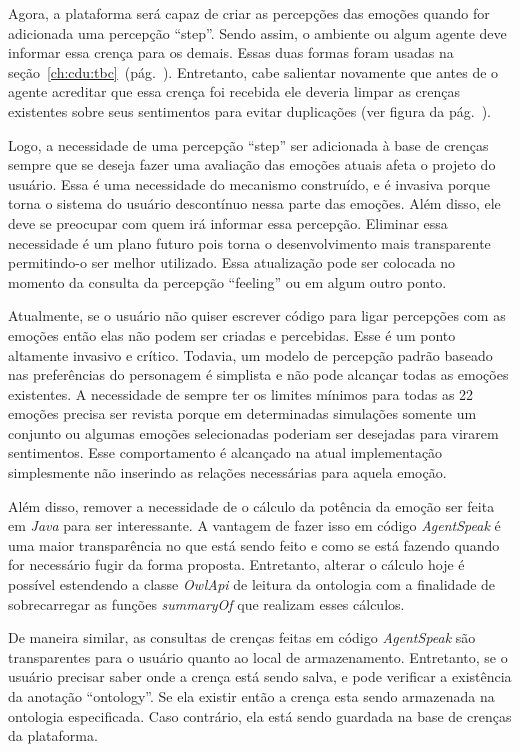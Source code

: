 Agora, a plataforma \jason será capaz de criar as percepções das emoções
quando for adicionada uma percepção ``step''. Sendo assim, o ambiente ou algum
agente deve informar essa crença para os demais.  Essas duas formas foram
usadas na seção~\ref{ch:cdu:tbc}~(pág.~\pageref{ch:cdu:tbc}). Entretanto, cabe
salientar novamente que antes de o agente acreditar que essa crença foi
recebida ele deveria limpar as crenças existentes sobre seus sentimentos para
evitar duplicações (ver figura da pág.~\pageref{fig:testeJasonIntBase}).

Logo, a necessidade de uma percepção ``step'' ser adicionada à base de crenças
sempre que se deseja fazer uma avaliação das emoções atuais afeta o projeto do
usuário. Essa é uma necessidade do mecanismo construído, e é invasiva porque torna
o sistema do usuário descontínuo nessa parte das emoções. Além disso, ele deve
se preocupar com quem irá informar essa percepção. Eliminar essa necessidade é
um plano futuro pois torna o desenvolvimento mais transparente permitindo-o ser
melhor utilizado. Essa atualização pode ser colocada no momento da consulta da
percepção ``feeling'' ou em algum outro ponto.

Atualmente, se o usuário não quiser escrever código para ligar percepções com as
emoções então elas não podem ser criadas e percebidas. Esse é um ponto
altamente invasivo e crítico. %
Todavia, um modelo de percepção padrão baseado nas preferências do personagem
é simplista e não pode alcançar todas as emoções existentes. A necessidade de
sempre ter os limites mínimos para todas as 22 emoções precisa ser revista
porque em determinadas simulações somente um conjunto ou algumas emoções
selecionadas poderiam ser desejadas para virarem sentimentos. Esse
comportamento é alcançado na atual implementação simplesmente não inserindo as
relações necessárias para aquela emoção.

Além disso, remover a necessidade de o cálculo da potência da emoção ser feita
em \emph{Java} para ser interessante. A vantagem de fazer isso em código
\emph{AgentSpeak} é uma maior transparência no que está sendo feito e como se
está fazendo quando for necessário fugir da forma proposta. Entretanto,
alterar o cálculo hoje é possível estendendo a classe \emph{OwlApi} de leitura
da ontologia com a finalidade de sobrecarregar as funções \emph{summaryOf} que
realizam esses cálculos.

De maneira similar, as consultas de crenças feitas em código \emph{AgentSpeak}
são transparentes para o usuário quanto ao local de armazenamento. Entretanto,
se o usuário precisar saber onde a crença está sendo salva, e pode verificar
a existência da anotação ``ontology''. Se ela existir então a crença esta
sendo armazenada na ontologia especificada. Caso contrário, ela está sendo
guardada na base de crenças da plataforma.

